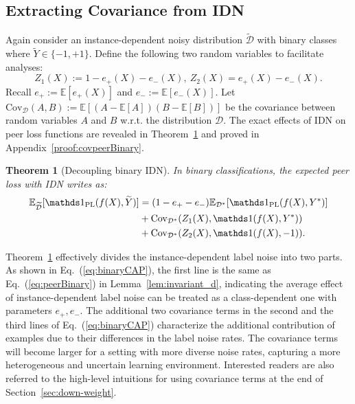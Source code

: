 \documentclass[final]{cvpr}
\newcommand{\BR}{\mathds 1}
\newcommand{\E}{\mathbb E}
\newtheorem{theorem}{Theorem}
\newcommand{\rev}[1]{{\color{blue}#1}}
\newcommand{\rev}[1]{#1}
\begin{document}
\subsection{Extracting Covariance from IDN}\label{sec:extension}




Again consider an instance-dependent noisy distribution $\widetilde{\mathcal D}$ with binary classes where $\widetilde Y\in\{-1,+1\}$.
Define the following two random variables \rev{to facilitate analyses}:
\[
Z_1(X):= 1-e_+(X)-e_-(X), ~Z_2(X) = e_+(X) - e_-(X).
\]
Recall $e_+:=\E[e_+(X)]$ and $e_-:=\E[e_-(X)]$.
Let $\text{Cov}_{\mathcal D}(A,B):=\E[(A-\E[A])(B-\E[B])]$ be the covariance between random variables $A$ and $B$ w.r.t. the distribution $\mathcal D$.
The exact effects of IDN on peer loss functions are revealed in Theorem~\ref{thm:covpeerBinary} and proved in Appendix~\ref{proof:covpeerBinary}.

\begin{theorem}[Decoupling binary IDN]
\label{thm:covpeerBinary}
In binary classifications, the expected peer loss with IDN writes as:
\begin{align}
        \E_{\widetilde{\mathcal D}}[{\BR_{\text{PL}}}(f(X),\widetilde{Y})] &=(1-e_+-e_-)\E_{\mathcal D^*}[{\BR_{\text{PL}}}(f(X),Y^*)]\notag\\
&+\text{Cov}_{\mathcal D^*}(Z_1(X),\BR(f(X),Y^*)) \notag \\
&+\text{Cov}_{\mathcal D^*}(Z_2(X),\BR(f(X),-1)). \label{eq:binaryCAP}
\end{align}
\end{theorem}


Theorem~\ref{thm:covpeerBinary} effectively divides the instance-dependent label noise into two parts.
As shown in Eq.~(\ref{eq:binaryCAP}), the first line is the same as Eq.~(\ref{eq:peerBinary}) in Lemma~\ref{lem:invariant_d}, indicating the average effect of instance-dependent label noise can be treated as a class-dependent one with parameters $e_+,e_-$. The additional two covariance terms in the second and the third lines of Eq.~(\ref{eq:binaryCAP}) characterize the additional contribution of examples due to their differences in the label noise rates. The covariance terms will become larger for a setting with more diverse noise rates, capturing a more heterogeneous and uncertain learning environment. Interested readers are also referred to the high-level intuitions for using covariance terms at the end of Section~\ref{sec:down-weight}. 
\end{document}

